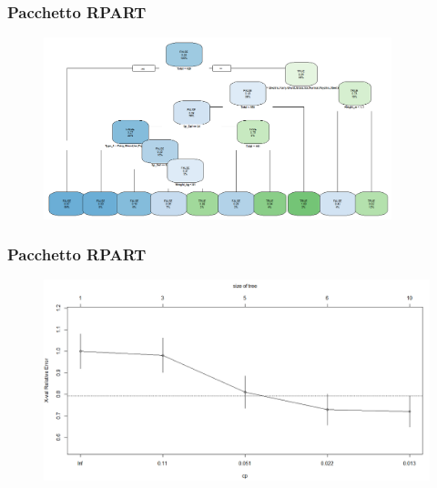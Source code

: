 	\begin{frame}
		\frametitle{Pacchetto RPART}
		\begin{center}
			\begin{figure}
				
			\end{figure}
			\begin{figure}
				\includegraphics[width=0.9\textwidth]{img/rpartEntr}
			\end{figure}
		\end{center}
	\end{frame}

	\begin{frame}
		\frametitle{Pacchetto RPART}
		\begin{center}
			\begin{figure}
				
			\end{figure}
			\begin{figure}
				\includegraphics[scale=0.3]{img/cventrrpart}
			\end{figure}
		\end{center}
	\end{frame}

